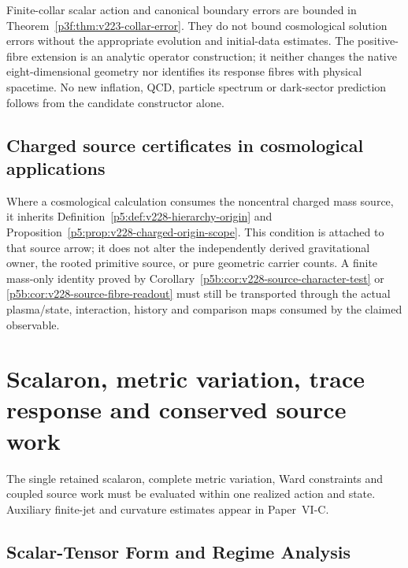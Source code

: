 \documentclass[12pt,a4paper]{article}
\begin{document}
Finite-collar scalar action and canonical boundary errors are bounded in
Theorem~\ref{p3f:thm:v223-collar-error}.  They do not bound cosmological
solution errors without the appropriate evolution and initial-data
estimates.  The positive-fibre extension is an analytic operator
construction; it neither changes the native eight-dimensional geometry
nor identifies its response fibres with physical spacetime.  No new
inflation, QCD, particle spectrum or dark-sector prediction follows
from the candidate constructor alone.


\subsection{Charged source certificates in cosmological applications}
\label{p6a:sec:v228-charged-source-scope}
Where a cosmological calculation consumes the noncentral charged mass
source, it inherits Definition~\ref{p5:def:v228-hierarchy-origin} and
Proposition~\ref{p5:prop:v228-charged-origin-scope}.
This condition is attached to that source arrow; it does not alter the
independently derived gravitational owner, the rooted primitive source,
or pure geometric carrier counts. A finite mass-only identity proved by
Corollary~\ref{p5b:cor:v228-source-character-test} or
\ref{p5b:cor:v228-source-fibre-readout} must still be transported through
the actual plasma/state, interaction, history and comparison maps consumed
by the claimed observable.


\endgroup



\section{Scalaron, metric variation, trace response and conserved source work}
\label{p6a:sec:organized-a3}
The single retained scalaron, complete metric variation, Ward constraints and coupled source work must be evaluated within one realized action and state. Auxiliary finite-jet and curvature estimates appear in Paper~VI-C.

\subsection{Scalar-Tensor Form and Regime Analysis}
\end{document}
